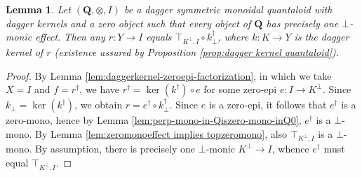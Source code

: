 \documentclass[12pt]{tac}
\newtheorem{lemma}[theorem]{Lemma}
\theoremstyle{definition}
\theoremstyle{remark}
\newcommand{\<}{\langle}
\renewcommand{\>}{\rangle}
\renewcommand{\:}{\colon}
\begin{document}
\begin{lemma}\label{lem:effects in terms of kernels}
    Let $(\mathbf Q,\otimes,I)$ be a  dagger symmetric monoidal quantaloid with dagger kernels and a zero object such that every object of $\mathbf Q$ has precisely one $\bot$-monic effect. Then any $r:Y\to I$ equals $\top_{K^\perp,I}\circ k_\perp^\dag$, where $k:K\to Y$ is the dagger kernel of $r$ (existence assured by Proposition \ref{prop:dagger kernel quantaloid}).
\end{lemma}
\begin{proof}
By Lemma \ref{lem:daggerkernel-zeroepi-factorization}, in which we take $X=I$ and $f=r^\dag$, we have $r^\dag=\ker(k^\dag)\circ e$ for some zero-epi $e:I\to K^\perp$. Since $k_\perp=\ker(k^\dag)$, we obtain $r=e^\dag\circ k_\perp^\dag$. Since $e$ is a zero-epi, it follows that $e^\dag$ is a zero-mono, hence by Lemma \ref{lem:perp-mono-in-Qiszero-mono-inQ0}, $e^\dag$ is a $\bot$-mono. By Lemma \ref{lem:zeromonoeffect implies topzeromono}, also $\top_{K^\perp,I}$ is a $\bot$-mono. By assumption, there is precisely one $\bot$-monic $K^\perp\to I$, whence $e^\dag$ must equal $\top_{K^\perp,I}$.
\end{proof}
\end{document}

